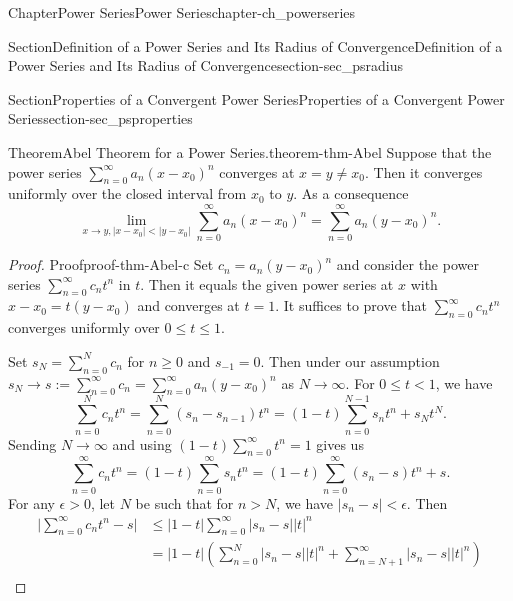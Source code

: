 \documentclass[oneside,10pt,]{book}
\numberwithin{equation}{section}
\newcommand{\lt}{<}
\newcommand{\gt}{>}
\newcommand{\amp}{&}
\begin{document}
\begin{chapterptx}{Chapter}{Power Series}{}{Power Series}{}{}{chapter-ch_powerseries}
\begin{sectionptx}{Section}{Definition of a Power Series and Its Radius of Convergence}{}{Definition of a Power Series and Its Radius of Convergence}{}{}{section-sec_psradius}
\end{sectionptx}
%
%
\typeout{************************************************}
\typeout{************************************************}
%
\begin{sectionptx}{Section}{Properties of a Convergent Power Series}{}{Properties of a Convergent Power Series}{}{}{section-sec_psproperties}
\begin{theorem}{Theorem}{Abel Theorem for a Power Series.}{}{theorem-thm-Abel}%
Suppose that the power series \(\sum_{n=0}^{\infty} a_{n}(x-x_{0})^{n}\) converges at \(x=y\ne x_{0}\). Then it converges uniformly	over the closed interval from \(x_{0}\) to \(y\). As a consequence%
\begin{equation*}
\lim_{x\to y, |x-x_{0}|\lt |y-x_{0}|} \sum_{n=0}^{\infty} a_{n}(x-x_{0})^{n}
=\sum_{n=0}^{\infty} a_{n}(y-x_{0})^{n}.
\end{equation*}
\end{theorem}
\begin{proof}{Proof}{}{proof-thm-Abel-c}
Set \(c_{n}=  a_{n}(y-x_{0})^{n}\) and consider the power series \(\sum_{n=0}^{\infty} c_{n}t^{n}\) in \(t\). Then it equals the given power series at \(x\) with \(x-x_{0}=t(y-x_{0})\) and converges at \(t=1\). It suffices to prove that \(\sum_{n=0}^{\infty} c_{n}t^{n}\) converges uniformly over \(0\le t \le 1\).%
\par
Set \(s_{N}= \sum_{n=0}^{N}c_{n}\) for \(n\ge 0\) and \(s_{-1}=0\). Then under our assumption \(s_{N} \to s:= \sum_{n=0}^{\infty} c_{n}= \sum_{n=0}^{\infty} a_{n}(y-x_{0})^{n}\) as \(N\to\infty\). For \(0\le t\lt 1\), we have%
\begin{equation*}
\sum_{n=0}^{N}c_{n} t^{n}= \sum_{n=0}^{N}\left( s_{n}-s_{n-1}\right) t^{n}=(1-t)\sum_{n=0}^{N-1} s_{n} t^{n}+s_{N}t^{N}.
\end{equation*}
Sending \(N\to \infty\) and using \((1-t)\sum_{n=0}^{\infty} t^{n}=1\) gives us%
\begin{equation*}
\sum_{n=0}^{\infty} c_{n}t^{n}= (1-t)\sum_{n=0}^{\infty} s_{n} t^{n}= (1-t)\sum_{n=0}^{\infty} \left(s_{n}-s\right) t^{n}+s.
\end{equation*}
For any \(\epsilon \gt 0\), let \(N\) be such that for \(n\gt N\), we have \(\vert s_{n}-s \vert \lt \epsilon\). Then%
\begin{align*}
\vert \sum_{n=0}^{\infty} c_{n}t^{n} -s \vert \amp \le |1-t| \sum_{n=0}^{\infty} \vert s_{n}-s \vert |t|^{n} \\
\amp = |1-t|\left( \sum_{n=0}^{N} \vert s_{n}-s \vert |t|^{n} + \sum_{n=N+1}^{\infty} \vert s_{n}-s \vert |t|^{n}\right)\\

\end{align*}
\end{proof}
\end{sectionptx}
\end{chapterptx}
\end{document}
